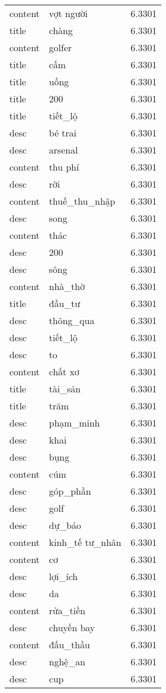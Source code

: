 \documentclass{article}
\begin{document}
\begin{tabular}{lll}
content & vợt người & 6.3301\\
title & chàng & 6.3301\\
content & golfer & 6.3301\\
title & cấm & 6.3301\\
title & uống & 6.3301\\
title & 200 & 6.3301\\
title & tiết\_lộ & 6.3301\\
desc & bé trai & 6.3301\\
desc & arsenal & 6.3301\\
content & thu phí & 6.3301\\
desc & rời & 6.3301\\
content & thuế\_thu\_nhập & 6.3301\\
desc & song & 6.3301\\
content & thác & 6.3301\\
desc & 200 & 6.3301\\
desc & sông & 6.3301\\
content & nhà\_thờ & 6.3301\\
title & đầu\_tư & 6.3301\\
desc & thông\_qua & 6.3301\\
desc & tiết\_lộ & 6.3301\\
desc & to & 6.3301\\
content & chất xơ & 6.3301\\
title & tài\_sản & 6.3301\\
title & trăm & 6.3301\\
desc & phạm\_minh & 6.3301\\
desc & khai & 6.3301\\
desc & bụng & 6.3301\\
content & cúm & 6.3301\\
desc & góp\_phần & 6.3301\\
desc & golf & 6.3301\\
desc & dự\_báo & 6.3301\\
content & kinh\_tế tư\_nhân & 6.3301\\
content & cơ & 6.3301\\
desc & lợi\_ích & 6.3301\\
desc & da & 6.3301\\
content & rửa\_tiền & 6.3301\\
desc & chuyến bay & 6.3301\\
content & đấu\_thầu & 6.3301\\
desc & nghệ\_an & 6.3301\\
desc & cup & 6.3301\\

\end{tabular}
\end{document}
